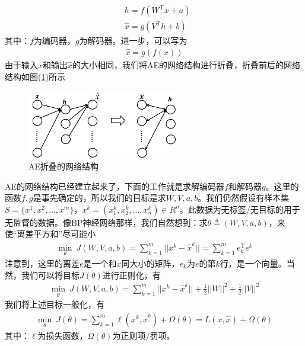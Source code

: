         \begin{align*}
        & h = f(W^\mathrm{T}x+a)\\
        & \hat{x} = g(V^\mathrm{T}h+b)
        \end{align*}
        其中：$f$为编码器，$g$为解码器。进一步，可以写为
        \begin{align*}
        \hat{x} = g(f(x))
        \end{align*}
        由于输入$x$和输出$\hat{x}$的大小相同，我们将AE的网络结构进行折叠，折叠前后的网络结构如图(\ref{fig:AE折叠的网络结构})所示
            \begin{figure}[H]
            \centering
            \includegraphics[height=3cm]{images/AE_fold_net_tructure.jpg}
            \caption{AE折叠的网络结构}
            \label{fig:AE折叠的网络结构}
            \end{figure}
        \par
        AE的网络结构已经建立起来了，下面的工作就是求解编码器$f$和解码器$g$。这里的函数$f,g$是事先确定的，所以我们的目标是求$W,V,a,b$。我们仍然假设有样本集$S = \{x^{1},x^{2},\dots,x^{m}\}$，$x^{k} = (x_1^k,x_2^k,\dots,x_n^k)\in R^n$。此数据为无标签/无目标的用于无监督的数据。像BP神经网络那样，我们自然想到：求$\theta\triangleq (W,V,a,b)$，来使“离差平方和”尽可能小
        \begin{align*}
        \min_\theta \ J(W,V,a,b) = \sum_{k=1}^m||x^k -\hat{x}^k|| = \sum_{k=1}^m e_k^\mathrm{T}e^k
        \end{align*}
        注意到，这里的离差$e$是一个和$x$同大小的矩阵，$e_k$为$e$的第$k$行，是一个向量。当然，我们可以将目标$J(\theta)$进行正则化，有
        \begin{align*}
        \min_\theta \ J(W,V,a,b) = \sum_{k=1}^m ||x^k - \hat{x}^k|| + \frac{1}{2} ||W||^2 + \frac{1}{2}||V||^2
        \end{align*}
        我们将上述目标一般化，有
        \begin{align*}
        \min_\theta \ J(\theta)= \sum_{k=1}^m \ell(x^k,\hat{x}^k) + \Omega (\theta) = L(x,\hat{x}) + \Omega(\theta)
        \end{align*}
        其中：$\ell$为损失函数，$\Omega(\theta)$为正则项/罚项。\\
